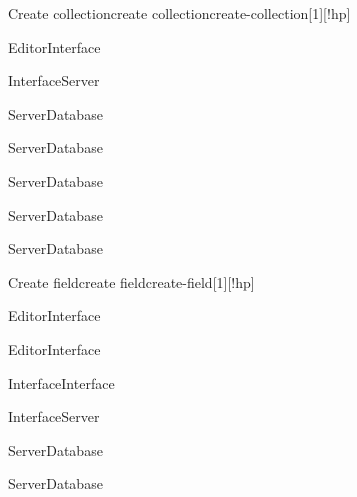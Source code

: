 \begin{sdfig}{Create collection}{create collection}{create-collection}[1][!hp]

  \begin{seqdigauth}[Editor]
    \begin{umlcall}[op={Create collection},return=Ok]{Editor}{Interface}
      \begin{umlcall}[op={Create collection},return=Ok]{Interface}{Server}
        \begin{umlcall}[op={Create collection}]{Server}{Database}
        \end{umlcall}
        \begin{umlcall}[op={Create field}]{Server}{Database}
        \end{umlcall}
        \begin{umlcall}[op={Create view}]{Server}{Database}
        \end{umlcall}
        \begin{umlcall}[op={Create document}]{Server}{Database}
        \end{umlcall}
        \begin{umlcall}[op={Create block}]{Server}{Database}
        \end{umlcall}
      \end{umlcall}
    \end{umlcall}
  \end{seqdigauth}
\end{sdfig}


\begin{sdfig}{Create field}{create field}{create-field}[1][!hp]

  \begin{seqdigauth}[Editor]
    \begin{umlcall}[op={Create field},return={Select type}]{Editor}{Interface}
    \end{umlcall}

    \begin{umlcall}[op={Select type},return=Ok]{Editor}{Interface}
      \begin{umlcall}[op={Update local state}]{Interface}{Interface}
      \end{umlcall}
      \begin{umlcall}[op={Create field},return=Ok]{Interface}{Server}
        \begin{umlcall}[op={Create field}]{Server}{Database}
        \end{umlcall}
        \begin{umlcall}[op={Create blocks}]{Server}{Database}
        \end{umlcall}
      \end{umlcall}
    \end{umlcall}
  \end{seqdigauth}
\end{sdfig}

